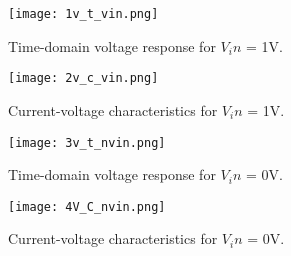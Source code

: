\begin{figure}[H]
    \centering
    \texttt{[image: 1v\_t\_vin.png]}
    \caption{Time-domain voltage response for $V_in$ = 1V.}
\end{figure}

\begin{figure}[H]
    \centering
    \texttt{[image: 2v\_c\_vin.png]}
    \caption{Current-voltage characteristics for $V_in$ = 1V.}
\end{figure}

\begin{figure}[H]
    \centering
    \texttt{[image: 3v\_t\_nvin.png]}
    \caption{Time-domain voltage response for $V_in$ = 0V.}
\end{figure}

\begin{figure}[H]
    \centering
    \texttt{[image: 4V\_C\_nvin.png]}
    \caption{Current-voltage characteristics for $V_in$ = 0V.}
\end{figure}